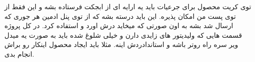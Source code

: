 توی کریت محصول برای جرعیات باید یه ارایه ای از ابجکت فرستاده بشه و این فقط از توی پست من امکان پذیره. این باید درسته بشه که از توی پنل ادمین هر جوری که ارسال شد بشه به اون صورتی که میخاید درش اورد و استفاده کرد. 
در کل پروژه قسمت هایی که ولیدیتور های زایدی دارن و خیلی شلوغ شده باید به صورت یه میدل ویر سره راه روتر باشه و استاندادردش اینه. مثلا باید ایجاد محصول اینکار رو براش انجام بدی.
